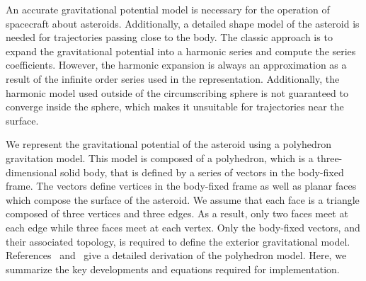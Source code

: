 An accurate gravitational potential model is necessary for the operation of spacecraft about asteroids.
Additionally, a detailed shape model of the asteroid is needed for trajectories passing close to the body.
The classic approach is to expand the gravitational potential into a harmonic series and compute the series coefficients.
However, the harmonic expansion is always an approximation as a result of the infinite order series used in the representation.
Additionally, the harmonic model used outside of the circumscribing sphere is not guaranteed to converge inside the sphere, which makes it unsuitable for trajectories near the surface.

We represent the gravitational potential of the asteroid using a polyhedron gravitation model.
This model is composed of a polyhedron, which is a three-dimensional solid body, that is defined by a series of vectors in the body-fixed frame.
The vectors define vertices in the body-fixed frame as well as planar faces which compose the surface of the asteroid.
We assume that each face is a triangle composed of three vertices and three edges.
As a result, only two faces meet at each edge while three faces meet at each vertex.
Only the body-fixed vectors, and their associated topology, is required to define the exterior gravitational model.
References~\cite{werner1994} and~\cite{werner1996} give a detailed derivation of the polyhedron model.
Here, we summarize the key developments and equations required for implementation.

